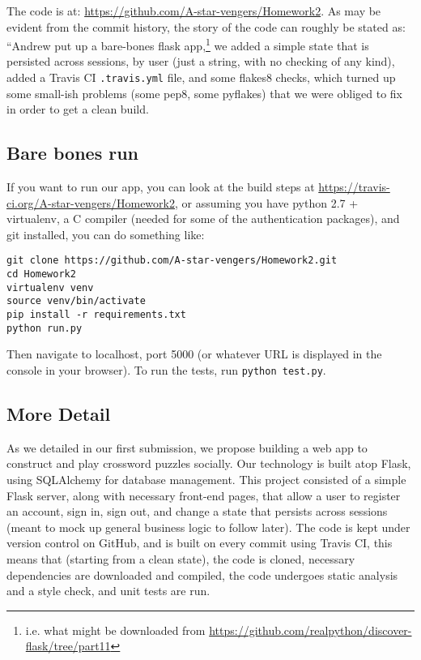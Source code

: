 \documentclass[10pt]{article}
\theoremstyle{remark}
\numberwithin{equation}{section}
\begin{document}
The code is at: \url{https://github.com/A-star-vengers/Homework2}. As may be evident from the commit history, the story of the code can roughly be stated as: ``Andrew put up a bare-bones flask app,\footnote{i.e. what might be downloaded from \url{https://github.com/realpython/discover-flask/tree/part11}} we added a simple state that is persisted across sessions, by user (just a string, with no checking of any kind), added a Travis CI \texttt{.travis.yml} file, and some flakes8 checks, which turned up some small-ish problems (some pep8, some pyflakes) that we were obliged to fix in order to get a clean build. 

\subsection{Bare bones run} 

If you want to run our app, you can look at the build steps at \url{https://travis-ci.org/A-star-vengers/Homework2}, or assuming you have python 2.7 + virtualenv, a C compiler (needed for some of the authentication packages), and git installed, you can do something like:

\begin{verbatim} 
git clone https://github.com/A-star-vengers/Homework2.git
cd Homework2
virtualenv venv
source venv/bin/activate
pip install -r requirements.txt
python run.py
\end{verbatim} 

Then navigate to localhost, port 5000 (or whatever URL is displayed in the console in your browser). To run the tests, run \texttt{python test.py}.

\subsection{More Detail}
As we detailed in our first submission, we propose building a web app to construct and play crossword puzzles socially. Our technology is built atop Flask, using SQLAlchemy for database management. This project consisted of a simple Flask server, along with necessary front-end pages, that allow a user to register an account, sign in, sign out, and change a state that persists across sessions (meant to mock up general business logic to follow later). The code is kept under version control on GitHub, and is built on every commit using Travis CI, this means that (starting from a clean state), the code is cloned, necessary dependencies are downloaded and compiled, the code undergoes static analysis and a style check, and unit tests are run. 
\end{document}
